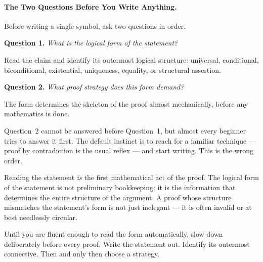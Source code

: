 \paragraph{The Two Questions Before You Write Anything.}

Before writing a single symbol, ask two questions in order.

\begin{tcolorbox}[colback=propbox, colframe=propborder, arc=2pt,
  left=6pt, right=6pt, top=4pt, bottom=4pt]
\textbf{Question 1.} \emph{What is the logical form of the statement?}

Read the claim and identify its outermost logical structure:
universal, conditional, biconditional, existential, uniqueness,
equality, or structural assertion.

\medskip
\textbf{Question 2.} \emph{What proof strategy does this form demand?}

The form determines the skeleton of the proof almost mechanically,
before any mathematics is done.
\end{tcolorbox}

\begin{remark}
Question~2 cannot be answered before Question~1, but almost every
beginner tries to answer it first. The default instinct is to reach for
a familiar technique --- proof by contradiction is the usual reflex ---
and start writing. This is the wrong order.

Reading the statement \emph{is} the first mathematical act of the proof.
The logical form of the statement is not preliminary bookkeeping; it
is the information that determines the entire structure of the argument.
A proof whose structure mismatches the statement's form is not just
inelegant --- it is often invalid or at best needlessly circular.

Until you are fluent enough to read the form automatically, slow down
deliberately before every proof. Write the statement out. Identify its
outermost connective. Then and only then choose a strategy.
\end{remark}

